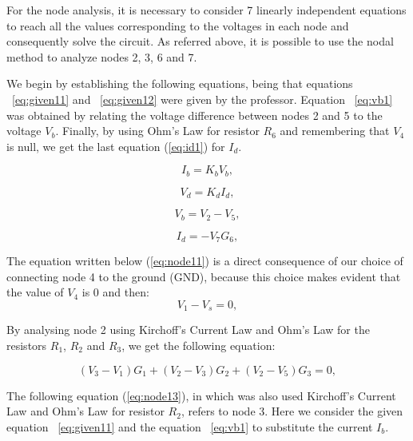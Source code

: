 For the node analysis, it is necessary to consider 7 linearly independent equations to reach all the values corresponding to the voltages in each node and consequently solve the circuit. As referred above, it is possible to use the nodal method to analyze nodes 2, 3, 6 and 7.

We begin by establishing the following equations, being that equations ~\ref{eq:given11} and ~\ref{eq:given12} were given by the professor. Equation ~\ref{eq:vb1} was obtained by relating the voltage difference between nodes 2 and 5 to the voltage $V_b$. Finally, by using Ohm's Law for resistor $R_6$ and remembering that $V_4$ is null, we get the last equation (\ref{eq:id1}) for $I_d$.

\begin{equation}
  I_{b} = K_{b}V_{b} ,
  \label{eq:given11}
\end{equation}

\begin{equation}
  V_{d} = K_{d}I_{d} ,
  \label{eq:given12}
\end{equation}

\begin{equation}
  V_{b} = V_{2} - V_{5} ,
  \label{eq:vb1}
\end{equation}

\begin{equation}
  I_{d} = -V_{7}G_{6} ,
  \label{eq:id1}
\end{equation}

The equation written below (\ref{eq:node11}) is a direct consequence of our choice of connecting node 4 to the ground (GND), because this choice makes evident that the value of $V_4$ is 0 and then:
\begin{equation}
  V_{1} - V_{s} = 0,
  \label{eq:node11}
\end{equation}

By analysing node 2 using Kirchoff's Current Law and Ohm's Law for the resistors $R_1$, $R_2$ and $R_3$, we get the following equation:

\begin{equation}
  (V_{3} - V_{1})G_{1} + (V_{2} - V_{3})G_{2} + (V_{2} - V_{5})G_{3}= 0,
  \label{eq:node12}
\end{equation}

The following equation (\ref{eq:node13}), in which was also used Kirchoff's Current Law and Ohm's Law for resistor $R_2$, refers to node 3. Here we consider the given equation ~\ref{eq:given11} and the equation ~\ref{eq:vb1} to substitute the current $I_b$.

